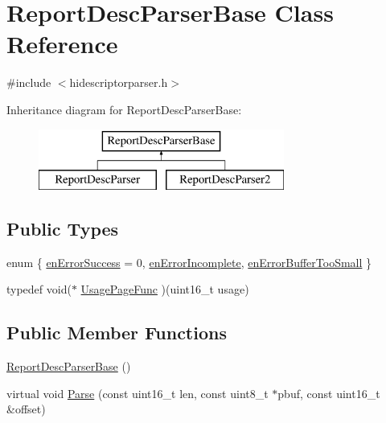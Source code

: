 \hypertarget{class_report_desc_parser_base}{\section{\-Report\-Desc\-Parser\-Base \-Class \-Reference}
\label{class_report_desc_parser_base}
}


{\ttfamily \#include $<$hidescriptorparser.\-h$>$}

\-Inheritance diagram for \-Report\-Desc\-Parser\-Base\-:\begin{figure}[H]
\begin{center}
\leavevmode
\includegraphics[height=2.000000cm]{class_report_desc_parser_base}
\end{center}
\end{figure}
\subsection*{\-Public \-Types}
\begin{DoxyCompactItemize}
\item 
enum \{ \hyperlink{class_report_desc_parser_base_a7eca95faa160e11b11fca798a5fd15caab24601408ad7a26379df557dab8f073a}{en\-Error\-Success} =  0, 
\hyperlink{class_report_desc_parser_base_a7eca95faa160e11b11fca798a5fd15caa36c789b01edcb0e3bd8fc74ad6450975}{en\-Error\-Incomplete}, 
\hyperlink{class_report_desc_parser_base_a7eca95faa160e11b11fca798a5fd15caaf987a827c15a079e71ad438be18366d4}{en\-Error\-Buffer\-Too\-Small}
 \}
\item 
typedef void($\ast$ \hyperlink{class_report_desc_parser_base_aeb139df01922910be7558b3c3a893db2}{\-Usage\-Page\-Func} )(uint16\-\_\-t usage)
\end{DoxyCompactItemize}
\subsection*{\-Public \-Member \-Functions}
\begin{DoxyCompactItemize}
\item 
\hyperlink{class_report_desc_parser_base_a607a81ff9d8f282298533a1dbf10f8e1}{\-Report\-Desc\-Parser\-Base} ()
\item 
virtual void \hyperlink{class_report_desc_parser_base_a7ecd266cbbbc18460ab8823651225e6b}{\-Parse} (const uint16\-\_\-t len, const uint8\-\_\-t $\ast$pbuf, const uint16\-\_\-t \&offset)
\end{DoxyCompactItemize}
